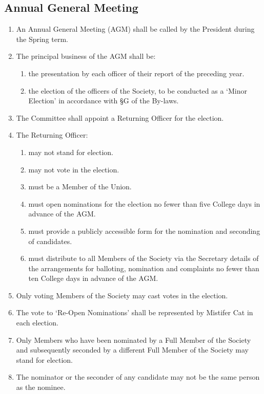 \documentclass[a4paper]{tufte-handout}
\newcommand{\policyOffset}{12pt}
\newcommand{\policyCspp}[2][\policyOffset]{\marginnote[#1]{\textsc{CSP Policy \S#2}}}
\newcommand{\policyBye}[2][\policyOffset]{\marginnote[#1]{\textsc{Bye-laws \S#2}}}
\begin{document}
\subsection{Annual General Meeting}
\begin{enumerate}[resume]
    \item An Annual General Meeting (AGM) shall be called by the President during the Spring term.
    \item The principal business of the AGM shall be:
        \begin{enumerate}
            \item the presentation by each officer of their report of the preceding year.
            \item \policyCspp{75 \& \S77} the election of the officers of the Society, to be conducted as a `Minor Election' in accordance with {\S}G of the By-laws.
        \end{enumerate}
    \item \policyBye{G2} The Committee shall appoint a Returning Officer for the election.
    \item The Returning Officer:
        \begin{enumerate}
            \item may not stand for election.
            \item may not vote in the election.
            \item must be a Member of the Union.
            \item must open nominations for the election no fewer than five College days in advance of the AGM.
            \item must provide a publicly accessible form for the nomination and seconding of candidates.
            \item must distribute to all Members of the Society via the Secretary details of the arrangements for balloting, nomination and complaints no fewer than ten College days in advance of the AGM.
        \end{enumerate}
    \item Only voting Members of the Society may cast votes in the election.
    \item The vote to `Re-Open Nominations' shall be represented by Mistifer Cat in each election.
    \item Only Members who have been nominated by a Full Member of the Society and subsequently seconded by a different Full Member of the Society may stand for election.
    \item The nominator or the seconder of any candidate may not be the same person as the nominee.

\end{enumerate}
\end{document}
